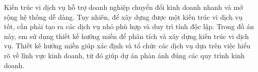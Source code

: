 Kiến trúc vi dịch vụ  hỗ trợ doanh nghiệp chuyển đổi kinh doanh nhanh và  mở rộng hệ thống dễ dàng.   Tuy nhiên, để xây dựng được một kiến trúc vi dịch vụ tốt, cần phải tạo ra các dịch vụ nhỏ phù hợp và duy trì tính độc lập.          Trong đồ án này, em sử dụng thiết kế hướng miền để phân tích và xây dựng kiến trúc vi dịch vụ.          Thiết kế hướng miền giúp xác định và tổ chức các dịch vụ dựa trên việc hiểu rõ về lĩnh vực kinh doanh, từ đó giúp dự án  phản ánh đúng các quy trình kinh doanh.